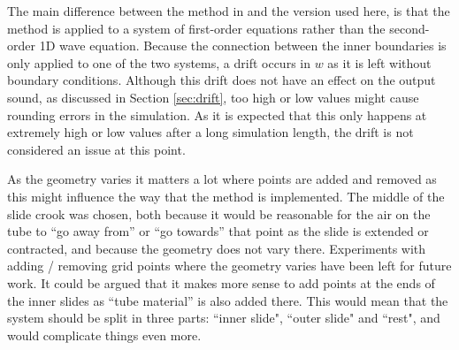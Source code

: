 The main difference between the method in \cite{Willemsen2021} and the version used here, is that the method is applied to a system of first-order equations rather than the second-order 1D wave equation. Because the connection between the inner boundaries is only applied to one of the two systems, a drift occurs in $w$ as it is left without boundary conditions. Although this drift does not have an effect on the output sound, as discussed in Section \ref{sec:drift}, too high or low values might cause rounding errors in the simulation. As it is expected that this only happens at extremely high or low values after a long simulation length, the drift is not considered an issue at this point. 




As the geometry varies it matters a lot where points are added and removed as this might influence the way that the method is implemented.  The middle of the slide crook was chosen, both because it would be reasonable for the air on the tube to ``go away from'' or ``go towards'' that point as the slide is extended or contracted, and because the geometry does not vary there. Experiments with adding / removing grid points where the geometry varies have been left for future work.  It could be argued that it makes more sense to add points at the ends of the inner slides as ``tube material'' is also added there. This would mean that the system should be split in three parts: ``inner slide", ``outer slide" and ``rest", and would complicate things even more.

